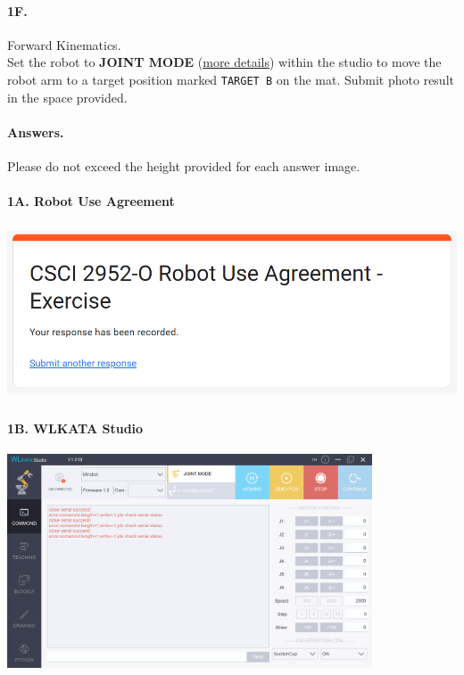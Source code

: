 \paragraph{1F.} Forward Kinematics.\\
\noindent Set the robot to \textbf{JOINT MODE} (\href{https://document.wlkata.com/?doc=/wlkata-mirobot-user-manual/12-quick-start-guide-of-mirobot/\#header-three-2mfvd}{more details}) within the studio to move the robot arm to a target position marked \texttt{TARGET B} on the mat. Submit photo result in the space provided.

\newpage

\paragraph{Answers.}
Please do not exceed the height provided for each answer image.


\paragraph{1A. Robot Use Agreement}
\begin{center}
    \includegraphics[height=2in]{image/1a_agreement.png}
\end{center}

\paragraph{1B. WLKATA Studio}
\begin{center}
    \includegraphics[height=2.5in]{image/1b_wlkata.png}
\end{center}

